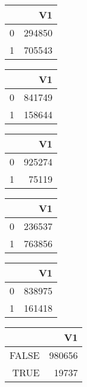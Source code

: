 \bigskip\bigskip
\centering
\begin{tabular}{rr}
  \hline
 & V1 \\ 
  \hline
0 & 294850 \\ 
  1 & 705543 \\ 
   \hline
\end{tabular}

\bigskip\bigskip
\centering
\begin{tabular}{rr}
  \hline
 & V1 \\ 
  \hline
0 & 841749 \\ 
  1 & 158644 \\ 
   \hline
\end{tabular}

\bigskip\bigskip
\centering
\begin{tabular}{rr}
  \hline
 & V1 \\ 
  \hline
0 & 925274 \\ 
  1 & 75119 \\ 
   \hline
\end{tabular}

\bigskip\bigskip
\centering
\begin{tabular}{rr}
  \hline
 & V1 \\ 
  \hline
0 & 236537 \\ 
  1 & 763856 \\ 
   \hline
\end{tabular}

\bigskip\bigskip
\centering
\begin{tabular}{rr}
  \hline
 & V1 \\ 
  \hline
0 & 838975 \\ 
  1 & 161418 \\ 
   \hline
\end{tabular}

\bigskip\bigskip
\centering
\begin{tabular}{rr}
  \hline
 & V1 \\ 
  \hline
FALSE & 980656 \\ 
  TRUE & 19737 \\ 
   \hline
\end{tabular}


